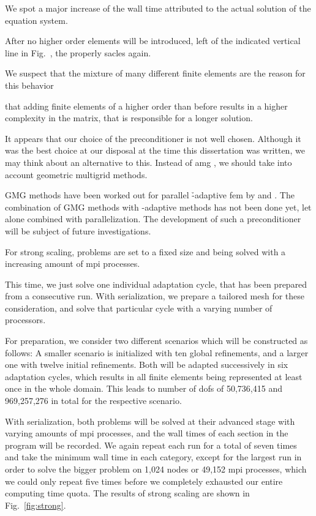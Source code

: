 We spot a major increase of the wall time attributed to the actual solution of the equation system.

After no higher order elements will be introduced, left of the indicated vertical line in Fig.~, the properly sacles again.

We suspect that the mixture of many different finite elements are the reason for this behavior

that adding finite elements of a higher order than before results in a higher complexity in the matrix, that is responsible for a longer solution.

It appears that our choice of the preconditioner is not well chosen. Although it was the best choice at our disposal at the time this dissertation was written, we may think about an alternative to this. Instead of \gls{amg} , we should take into account geometric multigrid methods. 

GMG methods have been worked out for parallel \h-adaptive \gls{fem} by \textcite{janssen2011} and \textcite{clevenger2020}. The combination of GMG methods with \hp-adaptive methods has not been done yet, let alone combined with parallelization. The development of such a preconditioner will be subject of future investigations.



For strong scaling, problems are set to a fixed size and being solved with a increasing amount of \gls{mpi} processes.

This time, we just solve one individual adaptation cycle, that has been prepared from a consecutive run. With serialization, we prepare a tailored mesh for these consideration, and solve that particular cycle with a varying number of processors.

For preparation, we consider two different scenarios which will be constructed as follows: A smaller scenario is initialized with ten global refinements, and a larger one with twelve initial refinements. Both will be adapted successively in six adaptation cycles, which results in all finite elements being represented at least once in the whole domain. This leads to number of \glspl{dof} of 50,736,415 and 969,257,276 in total for the respective scenario.

With serialization, both problems will be solved at their advanced stage with varying amounts of \gls{mpi} processes, and the wall times of each section in the program will be recorded. We again repeat each run for a total of seven times and take the minimum wall time in each category, except for the largest run in order to solve the bigger problem on 1,024 nodes or 49,152 \gls{mpi} processes, which we could only repeat five times before we completely exhausted our entire computing time quota. The results of strong scaling are shown in Fig.~\ref{fig:strong}.

